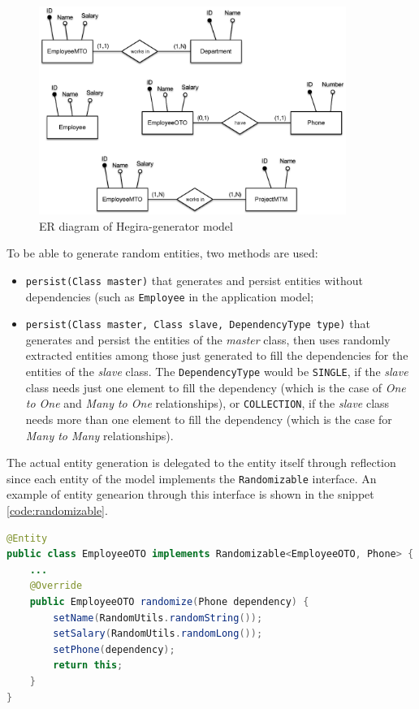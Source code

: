 \begin{figure}[tbh]
  \centering
  \includegraphics[width=10cm]{images/hegira_generator_er}
  \caption{ER diagram of Hegira-generator model}
  \label{fig:hegira-generator-er}
\end{figure} 

\noindent To be able to generate random entities, two methods are used:
\begin{itemize}
\item \texttt{persist(Class master)} that generates and persist entities without dependencies (such as \texttt{Employee} in the application model;
\item \texttt{persist(Class master, Class slave, DependencyType type)} that generates and persist the entities of the \textit{master} class, then uses randomly extracted entities among those just generated to fill the dependencies for the entities of the \textit{slave} class.
The \texttt{DependencyType} would be \texttt{SINGLE}, if the \textit{slave} class needs just one element to fill the dependency (which is the case of \textit{One to One} and \textit{Many to One} relationships), or \texttt{COLLECTION}, if the \textit{slave} class needs more than one element to fill the dependency (which is the case for \textit{Many to Many} relationships).
\end{itemize}

\noindent The actual entity generation is delegated to the entity itself through reflection since each entity of the model implements the \texttt{Randomizable} interface.
An example of entity genearion through this interface is shown in the snippet \ref{code:randomizable}.

\begin{lstlisting}[language=Java, caption=Entities generation, label=code:randomizable]
@Entity
public class EmployeeOTO implements Randomizable<EmployeeOTO, Phone> {
    ...
    @Override
    public EmployeeOTO randomize(Phone dependency) {
        setName(RandomUtils.randomString());
        setSalary(RandomUtils.randomLong());
        setPhone(dependency);
        return this;
    }
}
\end{lstlisting}
 
